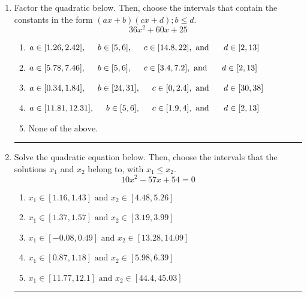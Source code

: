 \documentclass[14pt]{extbook}
\newcommand{\litem}[1]{\item#1\hspace*{-1cm}\rule{\textwidth}{0.4pt}}
\begin{document}
\begin{enumerate}
{\begin{enumerate}[label=\Alph*.]
\end{enumerate} }
\litem{
Factor the quadratic below. Then, choose the intervals that contain the constants in the form $(ax+b)(cx+d); b \leq d.$\[ 36x^{2} +60 x + 25 \]\begin{enumerate}[label=\Alph*.]
\item \( a \in [1.26, 2.42], \hspace*{5mm} b \in [5, 6], \hspace*{5mm} c \in [14.8, 22], \text{ and } \hspace*{5mm} d \in [2, 13] \)
\item \( a \in [5.78, 7.46], \hspace*{5mm} b \in [5, 6], \hspace*{5mm} c \in [3.4, 7.2], \text{ and } \hspace*{5mm} d \in [2, 13] \)
\item \( a \in [0.34, 1.84], \hspace*{5mm} b \in [24, 31], \hspace*{5mm} c \in [0, 2.4], \text{ and } \hspace*{5mm} d \in [30, 38] \)
\item \( a \in [11.81, 12.31], \hspace*{5mm} b \in [5, 6], \hspace*{5mm} c \in [1.9, 4], \text{ and } \hspace*{5mm} d \in [2, 13] \)
\item \( \text{None of the above.} \)

\end{enumerate} }
\litem{
Solve the quadratic equation below. Then, choose the intervals that the solutions $x_1$ and $x_2$ belong to, with $x_1 \leq x_2$.\[ 10x^{2} -57 x + 54 = 0 \]\begin{enumerate}[label=\Alph*.]
\item \( x_1 \in [1.16, 1.43] \text{ and } x_2 \in [4.48, 5.26] \)
\item \( x_1 \in [1.37, 1.57] \text{ and } x_2 \in [3.19, 3.99] \)
\item \( x_1 \in [-0.08, 0.49] \text{ and } x_2 \in [13.28, 14.09] \)
\item \( x_1 \in [0.87, 1.18] \text{ and } x_2 \in [5.98, 6.39] \)
\item \( x_1 \in [11.77, 12.1] \text{ and } x_2 \in [44.4, 45.03] \)


\end{enumerate}}
\end{enumerate}
\end{document}
